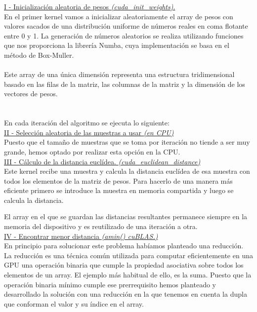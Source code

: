 \underline{I - Inicialización aleatoria de pesos \textit{(cuda\_init\_weights)}.}\\

En el primer kernel vamos a inicializar aleatoriamente el array de pesos con valores sacados de una distribución uniforme de números reales en coma flotante entre 0 y 1. La generación de números aleatorios se realiza utilizando funciones que nos proporciona la librería Numba, cuya implementación se basa en el método de Box-Muller. \\\\

Este array de una única dimensión representa una estructura tridimensional basado en las filas de la matriz, las columnas de la matriz y la dimensión de los vectores de pesos.\\\\\\

En cada iteración del algoritmo se ejecuta lo siguiente:\\

\underline{II - Selección aleatoria de las muestras a usar \textit{(en CPU)}}\\
Puesto que el tamaño de muestras que se toma por iteración no tiende a ser muy grande, hemos optado por realizar esta opción en la CPU.\\

\underline{III - Cálculo de la distancia euclídea. \textit{(cuda\_euclidean\_distance)}} \\
Este kernel recibe una muestra y calcula la distancia euclídea de esa muestra con todos los elementos de la matriz de pesos. Para hacerlo de una manera más eficiente primero se introduce la muestra en memoria compartida y luego se calcula la distancia.

El array en el que se guardan las distancias resultantes permanece siempre en la memoria del dispositivo y es reutilizado de una iteración a otra. \\

\underline{IV - Encontrar menor distancia \textit{(amin() cuBLAS.)}} \\
En principio para solucionar este problema habíamos planteado una reducción. La reducción es una técnica común utilizada para computar eficientemente en una GPU una operación binaria que cumple la propiedad asociativa sobre todos los elementos de un array. El ejemplo más habitual de ello, es la suma. Puesto que la operación binaria mínimo cumple ese prerrequisito hemos planteado y desarrollado la solución con una reducción en la que tenemos en cuenta la dupla que conforman el valor y su índice en el array.

